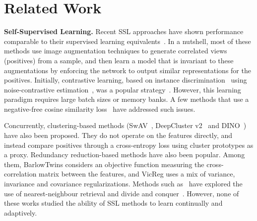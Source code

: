 \vspace{-5pt}
\section{Related Work}
\label{sec:related}
\vspace{-8pt}
\noindent\textbf{Self-Supervised Learning.} 
Recent SSL approaches have shown performance comparable to their supervised learning equivalents~\cite{caron2020unsupervised, caron2021emerging, chen2020simple, he2020momentum, grill2020bootstrap, zbontar2021barlow, bardes2021vicreg, chen2020improved}. In a nutshell, most of these methods use image augmentation techniques to generate correlated views (positives) from a sample, and then learn a model that is invariant to these augmentations by enforcing the network to output similar representations for the positives. Initially, contrastive learning, based on instance discrimination~\cite{wu2018unsupervised} using noise-contrastive estimation~\cite{gutmann2010noise, oord2018representation}, was a popular strategy~\cite{chen2020simple, he2020momentum}. However, this learning paradigm 
requires large batch sizes or memory banks. A few methods that use a negative-free cosine similarity loss~\cite{grill2020bootstrap, chen2021exploring} have addressed such issues.

Concurrently, clustering-based methods (SwAV~\cite{caron2020unsupervised}, DeepCluster v2~\cite{caron2020unsupervised, caron2018deep} and DINO~\cite{caron2021emerging}) have also been proposed. They do not operate on the features directly, and instead compare positives through a cross-entropy loss using cluster prototypes as a proxy. Redundancy reduction-based methods have also been popular\cite{ermolov2021whitening, zbontar2021barlow, bardes2021vicreg}. Among them, BarlowTwins \cite{zbontar2021barlow} considers an objective function measuring the cross-correlation matrix between the features, and VicReg\cite{bardes2021vicreg} uses a mix of variance, invariance and covariance
regularizations. Methods such as~\cite{dwibedi2021little} have explored the use of nearest-neighbour retrieval and divide and conquer~\cite{tian2021divide}. However, none of these works studied the ability of SSL methods to learn continually and adaptively.


